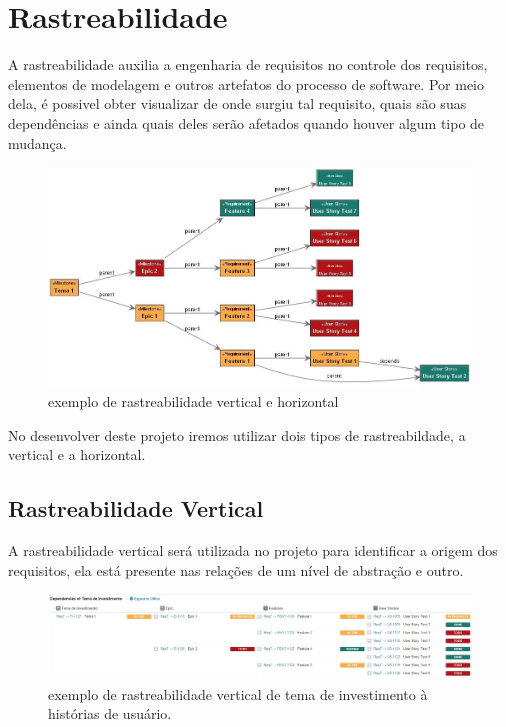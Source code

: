 \section{Rastreabilidade}
	A rastreabilidade auxilia a engenharia de requisitos no controle dos requisitos, elementos de modelagem e outros artefatos do processo de software. Por meio dela, é possivel obter visualizar de onde surgiu tal requisito, quais são suas dependências e ainda quais deles serão afetados quando houver algum tipo de mudança.\\

	\begin{figure}[!htb]
		\centering
		\includegraphics[width = \textwidth]{imagens/rastreabilidade.jpg}
		\caption{exemplo de rastreabilidade vertical e horizontal}
		\label{imagem}
	\end{figure}

	No desenvolver deste projeto iremos utilizar dois tipos de rastreabildade, a vertical e a horizontal.
	
	\subsection{Rastreabilidade Vertical}
	A rastreabilidade vertical será utilizada no projeto para identificar a origem dos requisitos, ela está presente nas relações de um nível de abstração e outro.\\

	\begin{landscape}
	\begin{figure}[!htb]
		\centering
		\vspace*{2.5cm}
		\hspace*{-1cm}
		\includegraphics[width = 1.5\textwidth, height = 0.5\textheight]{imagens/rastreabilidade_vertical.jpg}
		\caption{exemplo de rastreabilidade vertical de tema de investimento à histórias de usuário.}
		\label{imagem}
	\end{figure}
	\end{landscape}


